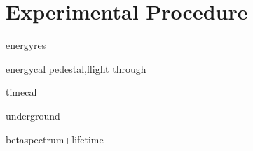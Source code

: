 \section{Experimental Procedure}


energyres


energycal
pedestal,flight through

timecal

underground

betaspectrum+lifetime
